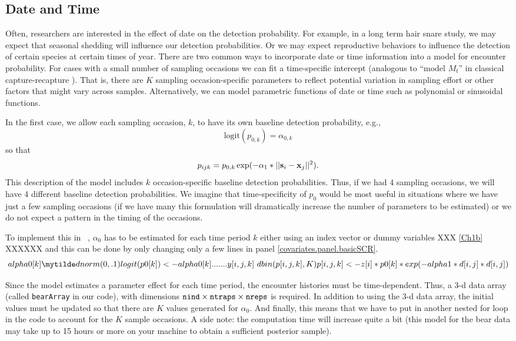 \subsection{Date and Time}

Often, researchers are interested in the effect of date on the detection
probability. For example, in a long term hair snare study, we may
expect that seasonal shedding will influence our detection
probabilities.  Or we may expect reproductive behaviors to influence
the detection of certain species at certain times of year.  There are
two common ways to incorporate date or time information into a model
for encounter probability. For cases with a small number of sampling
occasions we can fit a time-specific intercept (analogous to ``model
$M_{t}$'' in classical capture-recapture
\citep{otis_etal:1978}). That is, there are $K$ sampling occasion-specific
parameters to reflect potential variation in sampling effort or other
factors that might vary across samples.    Alternatively, we can model parametric
functions of date or time such as polynomial or sinusoidal functions.

In the first case, 
 we allow each sampling
occasion, $k$, to have its own baseline detection probability, e.g.,
\[
\mbox{logit}(p_{0,k}) = \alpha_{0,k}
\]
so that
\[
p_{ijk} = p_{0,k} \exp(- \alpha_1*||{\bf s}_{i}-{\bf x}_{j}||^2).
\]
This description of the model includes $k$ occasion-specific baseline
detection probabilities.  Thus, if we had 4 sampling occasions, we
will have 4 different baseline detection probabilities.  We imagine
that time-specificity of $p_{0}$ would be most useful in situations
where we have just a few sampling occasions (if we have many this
formulation will dramatically increase the number of parameters to be
estimated) or we do not expect a pattern in the timing of the
occasions.

To implement this in \jags~, $\alpha_0$ has to be
estimated for each time period $k$ either using an index vector or
dummy variables XXX \ref{Ch1b} XXXXXX and this can be done by only 
changing only a few lines in 
panel \ref{covariates.panel.basicSCR}.
\[
alpha0[k] \mytilde dnorm(0,.1)
logit(p0[k])<- alpha0[k]
.......
y[i,j,k] ~ dbin(p[i,j,k],K)
p[i,j,k]<- z[i]*p0[k]*exp(- alpha1*d[i,j]*d[i,j])
\]

Since the model estimates
a parameter effect for each time period, the encounter histories must be time-dependent. 
Thus, a 3-d data array (called \mbox{\tt bearArray} in our
code), with dimensions
$\mbox{\tt nind} \times \mbox{\tt ntraps} \times \mbox{\tt nreps}$ is required. In addition
to using the 3-d data array, the initial values must be updated so that 
there are $K$ values generated for $\alpha_0$.  And finally, this
means that we have to put in another nested for loop in the
code to account for the $K$ sample occasions.  
A side note: the computation time will increase quite a bit (this model
for the bear data may take up to 15 hours or more on your machine to obtain a sufficient
posterior sample).

